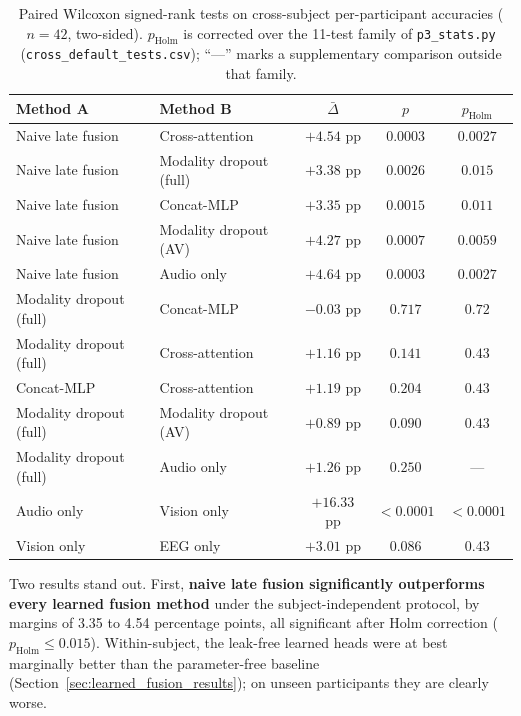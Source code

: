 \begin{table}[htbp]
\centering
\caption{Paired Wilcoxon signed-rank tests on cross-subject per-participant
accuracies ($n = 42$, two-sided). $p_{\mathrm{Holm}}$ is corrected over the 11-test
family of \texttt{p3\_stats.py} (\texttt{cross\_default\_tests.csv}); ``---'' marks a
supplementary comparison outside that family.}
\label{tab:cs_wilcoxon}
\begin{tabular}{llccc}
\hline
\textbf{Method A} & \textbf{Method B} & \textbf{$\bar{\Delta}$} & \textbf{$p$} & \textbf{$p_{\mathrm{Holm}}$} \\
\hline
Naive late fusion & Cross-attention        & $+4.54$ pp & $0.0003$ & $0.0027$ \\
Naive late fusion & Modality dropout (full)& $+3.38$ pp & $0.0026$ & $0.015$ \\
Naive late fusion & Concat-MLP             & $+3.35$ pp & $0.0015$ & $0.011$ \\
Naive late fusion & Modality dropout (AV)  & $+4.27$ pp & $0.0007$ & $0.0059$ \\
Naive late fusion & Audio only             & $+4.64$ pp & $0.0003$ & $0.0027$ \\
\hline
Modality dropout (full) & Concat-MLP       & $-0.03$ pp & $0.717$ & $0.72$ \\
Modality dropout (full) & Cross-attention   & $+1.16$ pp & $0.141$ & $0.43$ \\
Concat-MLP & Cross-attention               & $+1.19$ pp & $0.204$ & $0.43$ \\
Modality dropout (full) & Modality dropout (AV) & $+0.89$ pp & $0.090$ & $0.43$ \\
Modality dropout (full) & Audio only       & $+1.26$ pp & $0.250$ & --- \\
\hline
Audio only & Vision only                   & $+16.33$ pp & $<0.0001$ & $<0.0001$ \\
Vision only & EEG only                     & $+3.01$ pp & $0.086$ & $0.43$ \\
\hline
\end{tabular}
\end{table}

Two results stand out. First, \textbf{naive late fusion significantly outperforms
every learned fusion method} under the subject-independent protocol, by margins of
3.35 to 4.54 percentage points, all significant after Holm correction ($p_{\mathrm{Holm}} \le 0.015$).
Within-subject, the leak-free learned heads were at best marginally better than the
parameter-free baseline (Section~\ref{sec:learned_fusion_results}); on unseen
participants they are clearly worse.

